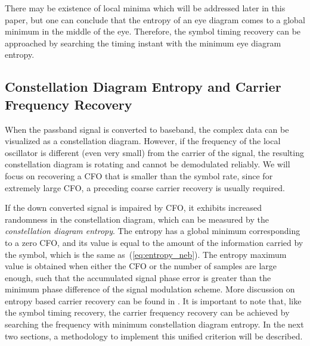 \documentclass[journal,comsoc,onecolumn, 12pt,draftclsnofoot]{IEEEtran}
\begin{document}
There may be existence of local minima which will be addressed later in this paper,
but one can conclude that the entropy of an eye diagram comes to a global minimum in the middle of the eye.
Therefore, the symbol timing recovery can be approached by searching the timing instant with the minimum eye diagram entropy.


\subsection{Constellation Diagram Entropy and Carrier Frequency Recovery}
\label{sec:const_entp}
When the passband signal is converted to baseband, the complex data can be visualized as a constellation diagram.
However, if the frequency of the local oscillator is  different (even very small) from the carrier of the signal, the resulting constellation diagram is rotating and cannot be demodulated reliably.
We will focus on recovering a CFO that is smaller than the symbol rate, since for extremely large CFO, a preceding coarse carrier recovery is usually required.

If the down converted signal is impaired by CFO, it exhibits increased randomness in the constellation diagram, which can be measured by the \textit{constellation diagram entropy}.
The entropy has a global minimum corresponding to a zero CFO, and its value is equal to the amount of the information carried by the symbol, which is the same as~(\ref{eq:entropy_neb}).
The entropy maximum value is obtained when either the CFO or the number of samples are large enough,
such that the accumulated signal phase error is greater than the minimum phase difference of the signal modulation scheme. 
More discussion on entropy based carrier recovery can be found in \cite{Pedzisz2006}.
It is important to note that, like the symbol timing recovery, the carrier frequency recovery can be achieved by searching the frequency with minimum constellation diagram entropy.
In the next two sections, a methodology to implement this unified criterion will be described.
\end{document}
